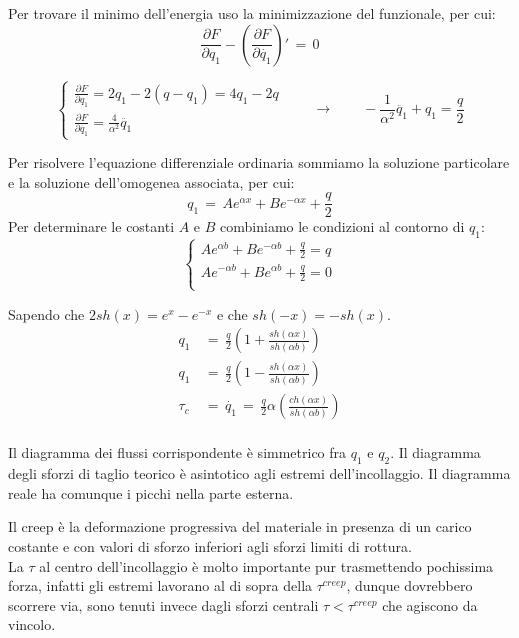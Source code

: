 Per trovare il minimo dell'energia uso la minimizzazione del funzionale, per cui:
\begin{equation*}
    \frac{\partial F}{\partial q_1} - \left(  \frac{\partial F}{\partial \dot{q_1}} \right)'\,=\,0
\end{equation*}

\begin{equation*}
    \begin{cases}
          \frac{\partial F}{\partial q_1} = 2q_1-2(q-q_1)=4q_1-2q\\
           \frac{\partial F}{\partial \dot{q_1}}= \frac{4}{\alpha^2} \ddot{q_1} 
    \end{cases}
    \qquad \rightarrow\qquad
    -\frac{1}{\alpha^2} \ddot{q_1} +q_1= \frac{q}{2}
\end{equation*}

Per risolvere l'equazione differenziale ordinaria sommiamo la soluzione particolare e la soluzione dell'omogenea associata, per cui:
\begin{equation*}
    q_1\,=\,Ae^{\alpha x} +Be^{-\alpha x}+\frac{q}{2}
\end{equation*}
Per determinare le costanti $A$ e $B$ combiniamo le condizioni al contorno di $q_1$:
\begin{equation*}
    \begin{cases}
        Ae^{\alpha b} +Be^{-\alpha b}+\frac{q}{2}=q\\
        Ae^{-\alpha b} +Be^{\alpha b}+\frac{q}{2}=0\\
    \end{cases}
\end{equation*}

Sapendo che $2sh(x) = e^x-e^{-x}$ e che $sh(-x)=-sh(x)$.
\begin{align*}
    q_1\,&=\,\frac{q}{2} \left(  1+\frac{sh(\alpha x)}{sh(\alpha b)}  \right)\\
     q_1\,&=\,\frac{q}{2} \left(  1-\frac{sh(\alpha x)}{sh(\alpha b)}  \right)\\
     \tau_c\,&=\, \dot{q_1}\,=\,\frac{q}{2} \alpha\left( \frac{ch(\alpha x)}{sh(\alpha b)}  \right)\\
\end{align*}

Il diagramma dei flussi corrispondente è simmetrico fra $q_1$ e $q_2$. Il diagramma degli sforzi di taglio teorico è asintotico agli estremi dell'incollaggio. Il diagramma reale ha comunque i picchi nella parte esterna.

Il creep è la deformazione progressiva del materiale in presenza di un carico costante e con valori di sforzo inferiori agli sforzi limiti di rottura.\\
La $\tau$ al centro dell'incollaggio è molto importante pur trasmettendo pochissima forza, infatti gli estremi lavorano al di sopra della $\tau^{creep}$, dunque dovrebbero scorrere via, sono tenuti invece dagli sforzi centrali $\tau<\tau^{creep}$ che agiscono da vincolo.
